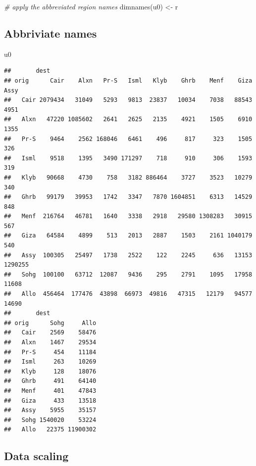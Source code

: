 \documentclass[
]{book}
\newenvironment{Shaded}{\begin{snugshade}}{\end{snugshade}}
\newcommand{\CommentTok}[1]{\textcolor[rgb]{0.56,0.35,0.01}{\textit{#1}}}
\newcommand{\FunctionTok}[1]{\textcolor[rgb]{0.00,0.00,0.00}{#1}}
\newcommand{\NormalTok}[1]{#1}
\newcommand{\OtherTok}[1]{\textcolor[rgb]{0.56,0.35,0.01}{#1}}
\begin{document}
\begin{Shaded}
\begin{Highlighting}[]
\CommentTok{\# apply the abbreviated region names}
\FunctionTok{dimnames}\NormalTok{(u0) }\OtherTok{\textless{}{-}}\NormalTok{ r}
\end{Highlighting}
\end{Shaded}

\hypertarget{abbriviate-names-2}{%
\subsection{Abbriviate names}\label{abbriviate-names-2}}

\begin{Shaded}
\begin{Highlighting}[]
\NormalTok{u0}
\end{Highlighting}
\end{Shaded}

\begin{verbatim}
##       dest
## orig      Cair    Alxn   Pr-S   Isml   Klyb    Ghrb    Menf    Giza    Assy
##   Cair 2079434   31049   5293   9813  23837   10034    7038   88543    4951
##   Alxn   47220 1085602   2641   2625   2135    4921    1505    6910    1355
##   Pr-S    9464    2562 168046   6461    496     817     323    1505     326
##   Isml    9518    1395   3490 171297    718     910     306    1593     319
##   Klyb   90668    4730    758   3182 886464    3727    3523   10279     340
##   Ghrb   99179   39953   1742   3347   7870 1604851    6313   14529     848
##   Menf  216764   46781   1640   3338   2918   29580 1308283   30915     567
##   Giza   64584    4899    513   2013   2887    1503    2161 1040179     540
##   Assy  100305   25497   1738   2522    122    2245     636   13153 1290255
##   Sohg  100100   63712  12087   9436    295    2791    1095   17958   11608
##   Allo  456464  177476  43898  66973  49816   47315   12179   94577   14690
##       dest
## orig      Sohg     Allo
##   Cair    2569    58476
##   Alxn    1467    29534
##   Pr-S     454    11184
##   Isml     263    10269
##   Klyb     128    18076
##   Ghrb     491    64140
##   Menf     401    47843
##   Giza     433    13518
##   Assy    5955    35157
##   Sohg 1540020    53224
##   Allo   22375 11900302
\end{verbatim}

\hypertarget{data-scaling}{%
\subsection{Data scaling}\label{data-scaling}}
\end{document}
